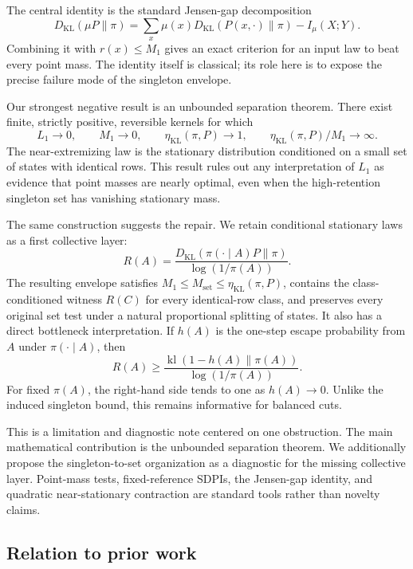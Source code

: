 \documentclass[11pt]{article}
\newcommand{\KL}{D_{\mathrm{KL}}}
\newcommand{\etaStat}{\eta_{\mathrm{KL}}(\pi,P)}
\newcommand{\Mone}{M_1}
\newcommand{\Lone}{L_1}
\newcommand{\Mset}{M_{\mathrm{set}}}
\newcommand{\kl}{\operatorname{kl}}
\begin{document}
The central identity is the standard Jensen-gap decomposition
\[
  \KL(\mu P\|\pi)
  =
  \sum_x\mu(x)\KL(P(x,\cdot)\|\pi)-I_\mu(X;Y).
\]
Combining it with \(r(x)\le\Mone\) gives an exact criterion for an input law
to beat every point mass.  The identity itself is classical; its role here
is to expose the precise failure mode of the singleton envelope.

Our strongest negative result is an unbounded separation theorem.  There
exist finite, strictly positive, reversible kernels for which
\[
  \Lone\to0,\qquad \Mone\to0,\qquad
  \etaStat\to1,\qquad \etaStat/\Mone\to\infty.
\]
The near-extremizing law is the stationary distribution conditioned on a
small set of states with identical rows.  This result rules out any
interpretation of \(\Lone\) as evidence that point masses are nearly
optimal, even when the high-retention singleton set has vanishing
stationary mass.

The same construction suggests the repair.  We retain conditional
stationary laws as a first collective layer:
\[
  R(A)=
  \frac{\KL(\pi(\cdot\mid A)P\|\pi)}{\log(1/\pi(A))}.
\]
The resulting envelope satisfies
\(\Mone\le\Mset\le\etaStat\), contains the class-conditioned witness
\(R(C)\) for every identical-row class, and
preserves every original set test under a natural proportional splitting
of states.  It also has a
direct bottleneck interpretation.  If \(h(A)\) is the one-step escape
probability from \(A\) under \(\pi(\cdot\mid A)\), then
\[
  R(A)\ge
  \frac{\kl(1-h(A)\|\pi(A))}{\log(1/\pi(A))}.
\]
For fixed \(\pi(A)\), the right-hand side tends to one as \(h(A)\to0\).
Unlike the induced singleton bound, this remains informative for balanced
cuts.

This is a limitation and diagnostic note centered on one obstruction.  The
main mathematical contribution is the unbounded separation theorem.  We
additionally propose the singleton-to-set organization as a diagnostic for
the missing collective layer.  Point-mass tests, fixed-reference
SDPIs, the Jensen-gap identity, and quadratic near-stationary contraction
are standard tools rather than novelty claims.

\subsection{Relation to prior work}
\label{sec:related}
\end{document}
